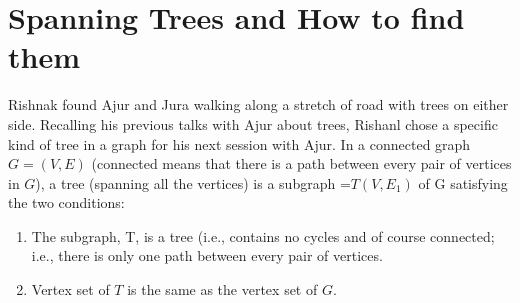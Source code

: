 \chapter{Spanning Trees and How to find them}
Rishnak found Ajur and Jura walking along a stretch of road with trees on either side. Recalling his previous talks with Ajur about trees, Rishanl chose a specific kind of tree in a graph for his next session with Ajur.
In a connected graph $G=(V,E)$ (connected means that there is a path between every pair of vertices in $G$), a tree (spanning all the vertices) is a subgraph =$T(V,E_1)$ of G satisfying the two conditions:
\begin{enumerate}
    \item The subgraph, T,  is a tree (i.e., contains no cycles and of course connected; i.e., there is only one path between every pair of vertices.
    \item Vertex set of $T$ is the same as the vertex set of $G$.
\end{enumerate}


